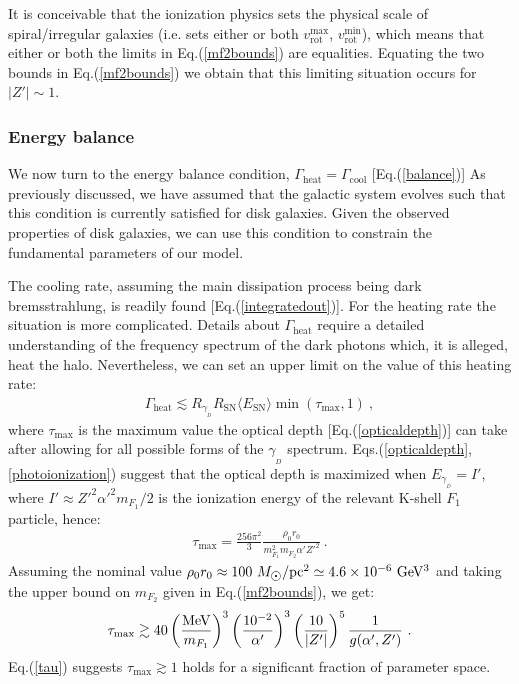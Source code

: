 \documentclass[12pt]{article}
\begin{document}
{{It is conceivable that the ionization physics sets the physical scale of
spiral/irregular galaxies (i.e. sets either or both $v _{\text{rot}}
^{\max}$, $v _{\text{rot}} ^{\min}$), which means that either or both
the limits in Eq.(\ref{mf2bounds}) are equalities. Equating the two
bounds in Eq.(\ref{mf2bounds}) we obtain that this limiting situation
occurs for $|Z'| \sim 1$.

\subsubsection{Energy balance}

We now turn to the energy balance condition, $\Gamma _{\text{heat}} =
\Gamma _{\text{cool}}$ [Eq.(\ref{balance})] As previously discussed, we
have assumed that the galactic system evolves such that this condition
is currently satisfied for disk galaxies. Given the observed properties
of disk galaxies, we can use this condition to constrain the fundamental
parameters of our model.

The cooling rate, assuming the main dissipation process being dark
bremsstrahlung, is readily found [Eq.(\ref{integratedout})]. For the
heating rate the situation is more complicated. Details about $\Gamma
_{\text{heat}}$ require a detailed understanding of the frequency
spectrum of the dark photons which, it is alleged, heat the halo.
Nevertheless, we can set an upper limit on the value of this heating
rate:
%
\begin{eqnarray}
\Gamma _{\text{heat}} \lesssim R _{\gamma _{_D}}R _{\text{SN}}\langle E
_{\text{SN}} \rangle \min(\tau _{\max},1) \ ,
\label{gammaheat}
\end{eqnarray}
%
where $\tau _{\max}$ is the maximum value the optical depth
[Eq.(\ref{opticaldepth})] can take after allowing for all possible forms
of the $\gamma _{_D}$ spectrum.
Eqs.(\ref{opticaldepth},\ref{photoionization}) suggest that the optical
depth is maximized when $E _{\gamma _{_D}} = I'$, where $I' \approx {Z'}
^2{\alpha '} ^2m _{F_1}/2$ is the ionization energy of the relevant
K-shell $F_1$ particle, hence:
%
\begin{eqnarray}
\tau _{\max} = \frac{256\pi ^2}{3}\frac{\rho _0r _0}{m _{F_1} ^2m
_{F_2}\alpha '{Z'} ^2} \ .
\label{taumax}
\end{eqnarray}
%
Assuming the nominal value $\rho _0r _0 \approx 100 \ M
_{\astrosun}/{\rm pc ^2} \simeq 4.6 \times 10 ^{-6} \ {\rm GeV ^3}$ and
taking the upper bound on $m _{F_2}$ given in Eq.(\ref{mf2bounds}), we
get:
%
\begin{eqnarray}
\tau _{\max} \gtrsim 40 \left ( \frac{\rm MeV}{m _{F_1}} \right )
^3\left ( \frac{10 ^{-2}}{\alpha '} \right ) ^3\left ( \frac{10}{|Z'|}
\right ) ^5\frac{1}{g(\alpha ',Z')} \ .
\label{tau}
\end{eqnarray}
%
Eq.(\ref{tau}) suggests $\tau _{\max}\gtrsim 1$ holds for a significant
fraction of parameter space.

}}
\end{document}
